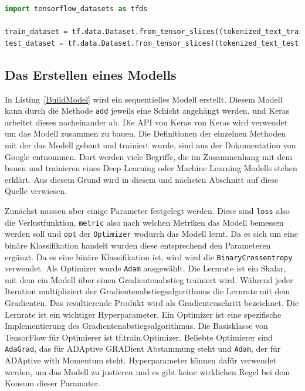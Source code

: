 \begin{lstlisting}[language=Python,caption=Die Dataset Erstellung]
import tensorflow_datasets as tfds

train_dataset = tf.data.Dataset.from_tensor_slices((tokenized_text_train, y))
test_dataset = tf.data.Dataset.from_tensor_slices((tokenized_text_test, y_test))
\end{lstlisting}\label{DataSet}





\subsection{Das Erstellen eines Modells}



In Listing~\ref{BuildModel} wird ein sequentielles Modell erstellt. Diesem Modell kann durch die Methode \texttt{add} jeweils eine Schicht angehängt werden, und Keras arbeitet dieses nacheinander ab. Die API von Keras von Keras wird verwendet um das Modell zusammen zu bauen. Die Definitionen der einzelnen Methoden mit der das Modell gebaut und trainiert wurde, sind aus der Dokumentation von Google\citep{google1} entnommen. Dort werden viele Begriffe, die im Zusammenhang mit dem bauen und trainieren eines Deep Learning oder Machine Learning Modells stehen erklärt. Aus diesem Grund wird in diesem und nächsten Abschnitt auf diese Quelle verwiesen.

Zunächst mussen aber einige Parameter festgelegt werden. Diese sind \texttt{loss} also die Verlustfunktion, \texttt{metric} also nach welchen Metriken das Modell bemessen werden soll und \texttt{opt} der \texttt{Optimizer} wodurch das Modell lernt. Da es sich um eine binäre Klassifikation handelt wurden diese entsprechend den Parameteren ergänzt. Da es eine binäre Klassifikation ist, wird wird die \texttt{BinaryCrossentropy} verwendet. Als Optimizer wurde \texttt{Adam} ausgewählt. Die Lernrate ist ein Skalar, mit dem ein Modell über einen Gradientenabstieg trainiert wird. Während jeder Iteration multipliziert der Gradientenabstiegsalgorithmus die Lernrate mit dem Gradienten. Das resultierende Produkt wird als Gradientenschritt bezeichnet. Die Lernrate ist ein wichtiger Hyperparameter. Ein Optimizer ist eine spezifische Implementierung des Gradientenabstiegsalgorithmus. Die Basisklasse von TensorFlow für Optimierer ist tf.train.Optimizer. Beliebte Optimierer sind \texttt{AdaGrad}, das für ADAptive GRADient Abstammung steht und \texttt{Adam}, der für ADAptive with Momentum steht. Hyperparameter können dafür verwendet werden, um das Modell zu justieren und es gibt keine wirklichen Regel bei dem Konsum dieser Paramater. 

